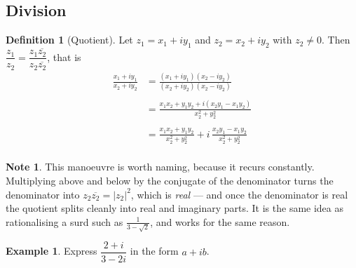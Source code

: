 \documentclass[11pt,a4paper]{article}
\theoremstyle{definition}
\newtheorem{definition}[thm]{Definition}
\newtheorem{example}[thm]{Example}
\newtheorem{note}[thm]{Note}
\begin{document}
\subsection{Division}

\begin{definition}[Quotient]
Let $z_1=x_1+iy_1$ and $z_2=x_2+iy_2$ with $z_2\neq0$. Then
$\dfrac{z_1}{z_2}=\dfrac{z_1\overline{z_2}}{z_2\overline{z_2}}$, that is
\begin{align*}
\frac{x_1+iy_1}{x_2+iy_2} & =\frac{(x_1+iy_1)(x_2-iy_2)}{(x_2+iy_2)(x_2-iy_2)}\\\\
                          & = \frac{x_1x_2+y_1y_2+i(x_2y_1-x_1y_2)}{x_2^2+y_2^2}\\\\
                          & = \frac{x_1x_2+y_1y_2}{x_2^2+y^2_2}+i\,\frac{x_2y_1-x_1y_2}{x^2_2+y^2_2}\\
\end{align*}
\end{definition}

\begin{note}
This manoeuvre is worth naming, because it recurs constantly. Multiplying above and
below by the conjugate of the denominator turns the denominator into
$z_2\overline{z_2}=\left|z_2\right|^{2}$, which is \emph{real} --- and once the
denominator is real the quotient splits cleanly into real and imaginary parts. It
is the same idea as rationalising a surd such as $\frac{1}{3-\sqrt{2}}$, and works
for the same reason.
\end{note}

\begin{example}
Express $\dfrac{2+i}{3-2i}$ in the form $a+ib$.
\end{example}
\end{document}
